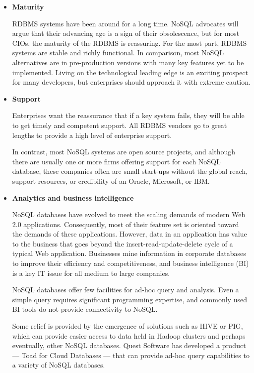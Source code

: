 \begin{itemize}

\item \textbf{Maturity}

RDBMS systems have been around for a long time. NoSQL advocates will argue that their advancing age is a sign of their obsolescence, but for most CIOs, the maturity of the RDBMS is reassuring. For the most part, RDBMS systems are stable and richly functional. In comparison, most NoSQL alternatives are in pre-production versions with many key features yet to be implemented. Living on the technological leading edge is an exciting prospect for many developers, but enterprises should approach it with extreme caution.

\item \textbf{Support}

Enterprises want the reassurance that if a key system fails, they will be able to get timely and competent support. All RDBMS vendors go to great lengths to provide a high level of enterprise support.

In contrast, most NoSQL systems are open source projects, and although there are usually one or more firms offering support for each NoSQL database, these companies often are small start-ups without the global reach, support resources, or credibility of an Oracle, Microsoft, or IBM.
 
\item \textbf{Analytics and business intelligence}

NoSQL databases have evolved to meet the scaling demands of modern Web 2.0 applications. Consequently, most of their feature set is oriented toward the demands of these applications. However, data in an application has value to the business that goes beyond the insert-read-update-delete cycle of a typical Web application. Businesses mine information in corporate databases to improve their efficiency and competitiveness, and business intelligence (BI) is a key IT issue for all medium to large companies.

NoSQL databases offer few facilities for ad-hoc query and analysis. Even a simple query requires significant programming expertise, and commonly used BI tools do not provide connectivity to NoSQL.

Some relief is provided by the emergence of solutions such as HIVE or PIG, which can provide easier access to data held in Hadoop clusters and perhaps eventually, other NoSQL databases. Quest Software has developed a product — Toad for Cloud Databases — that can provide ad-hoc query capabilities to a variety of NoSQL databases.


\end{itemize}
